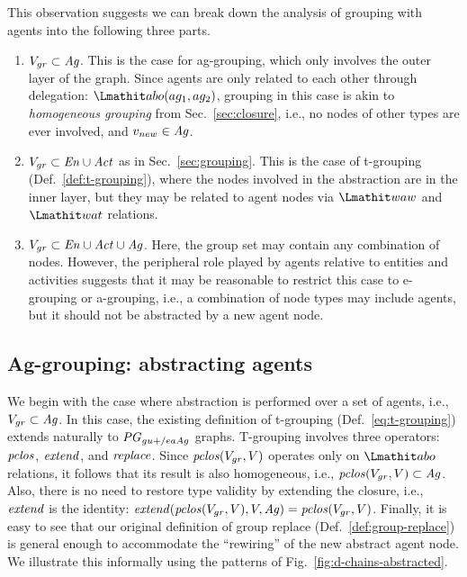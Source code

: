 This observation suggests we can break down the analysis of grouping with agents into the following three parts.
%
\begin{enumerate}
\item $V_{gr} \subset \mathit{Ag}$. This is the case for ag-grouping, which only involves the outer layer of the graph. Since agents are only related to each other through delegation: $\delegate(ag_1 , ag_2)$, grouping in this case is akin to \textit{homogeneous grouping} from Sec.~\ref{sec:closure}, i.e., no nodes of other types are ever involved, and $v_{new} \in \mathit{Ag}$.

\item $V_{gr} \subset \mathit{En} \cup \mathit{Act}$ as in Sec.~\ref{sec:grouping}. This is the case of t-grouping (Def.~\ref{def:t-grouping}), where the nodes involved in the abstraction are in the inner layer, but they may be related to agent nodes via $\waw$ and $\wat$ relations.

\item $V_{gr} \subset \mathit{En} \cup \mathit{Act} \cup \mathit{Ag}$.  Here, the group set may contain any combination of nodes. However, the peripheral role played by agents relative to entities and activities suggests that it may be reasonable to restrict this case to e-grouping or a-grouping, i.e., a combination of node types may include agents, but it should not be abstracted by a new agent node.
%
\end{enumerate}



\subsection{Ag-grouping: abstracting agents}  \label{sec:ag-grouping}

We begin with the case where abstraction is performed over a set of agents, i.e., $V_{gr} \subset \mathit{Ag}$.
%
In this case, the existing definition of t-grouping (Def.~\ref{eq:t-grouping}) extends naturally to $\mathit{PG}_{gu+/eaAg}$ graphs.
%
%
T-grouping involves three operators: $\mathit{pclos}$, $\mathit{extend}$, and $\mathit{replace}$.
%
Since $\mathit{pclos}(V_{gr}, V)$ operates only on $\delegate$ relations, it follows that its result is also homogeneous, i.e., $\mathit{pclos}(V_{gr}, V) \subset \mathit{Ag}$. Also, there is no need to restore type validity by extending the closure, i.e., $\mathit{extend}$ is the identity: $\mathit{extend}(\mathit{pclos}(V_{gr}, V), V, \mathit{Ag}) = \mathit{pclos}(V_{gr}, V)$.
%
Finally, it is easy to see that our original definition of group replace (Def.~\ref{def:group-replace}) is general enough to accommodate the ``rewiring'' of the new abstract agent node. 
%
We illustrate this informally using the patterns of Fig.~\ref{fig:d-chains-abstracted}.
%

